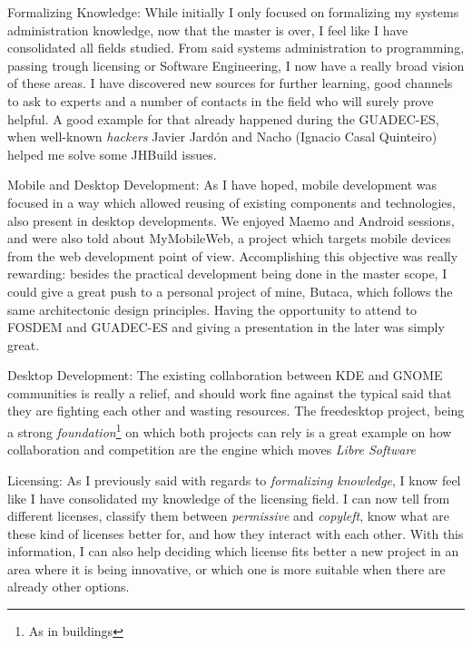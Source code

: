\begin{description}
\item {Formalizing Knowledge:} While initially I only focused on formalizing
my systems administration knowledge, now that the master is over, I feel like
I have consolidated all fields studied. From said systems administration to programming,
passing trough licensing or Software Engineering, I now have a really broad vision
of these areas. I have discovered new sources for further learning, good channels
to ask to experts and a number of contacts in the field who will surely prove
helpful. A good example for that already happened during the GUADEC-ES, when
well-known {\it hackers} Javier Jard\'on and Nacho (Ignacio Casal Quinteiro) helped
me solve some JHBuild issues.

\item {Mobile and Desktop Development}: As I have hoped, mobile development was
focused in a way which allowed reusing of existing components and technologies,
also present in desktop developments. We enjoyed Maemo and Android sessions, and
were also told about MyMobileWeb, a project which targets mobile devices from
the web development point of view. Accomplishing this objective was really
rewarding: besides the practical development being done in the master scope,
I could give a great push to a personal project of mine, Butaca, which follows
the same architectonic design principles. Having the opportunity
to attend to FOSDEM and GUADEC-ES and giving a presentation in the later was
simply great.

\item {Desktop Development}: The existing collaboration between KDE and GNOME
communities is really a relief, and should work fine against the typical
said that they are fighting each other and wasting resources. The freedesktop
project, being a strong {\it foundation}\footnote{As in buildings} on which both
projects can rely is a great example on how collaboration and competition are
the engine which moves {\it Libre Software}

\item {Licensing:} As I previously said with regards to {\it formalizing knowledge},
I know feel like I have consolidated my knowledge of the licensing field. I can now
tell from different licenses, classify them between {\it permissive} and {\it copyleft},
know what are these kind of licenses better for, and how they interact with
each other. With this information, I can also help deciding which license fits better
a new project in an area where it is being innovative, or which one is more
suitable when there are already other options.


\end{description}
